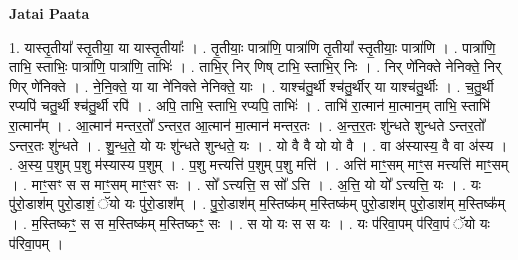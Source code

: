 \documentclass[17pt]{extarticle}
\begin{document}
\textbf{Jatai Paata} \newline

1. यास्तृ॒तीया᳚ स्तृ॒तीया॒ या यास्तृ॒तीयाः᳚ । . तृ॒तीयाः॒ पात्रा॑णि॒ पात्रा॑णि तृ॒तीया᳚ स्तृ॒तीयाः॒ पात्रा॑णि । . पात्रा॑णि॒ ताभि॒ स्ताभिः॒ पात्रा॑णि॒ पात्रा॑णि॒ ताभिः॑ । . ताभि॒र् निर् णिष् टाभि॒ स्ताभि॒र् निः । . निर् णे॑निक्ते नेनिक्ते॒ निर् णिर् णे॑निक्ते । . ने॒नि॒क्ते॒ या या ने॑निक्ते नेनिक्ते॒ याः । . याश्च॑तु॒र्थी श्च॑तु॒र्थीर् या याश्च॑तु॒र्थीः । . च॒तु॒र्थी रप्यपि॑ चतु॒र्थी श्च॑तु॒र्थी रपि॑ । . अपि॒ ताभि॒ स्ताभि॒ रप्यपि॒ ताभिः॑ । . ताभि॑ रा॒त्मान॑ मा॒त्मान॒म् ताभि॒ स्ताभि॑ रा॒त्मान᳚म् । . आ॒त्मान॑ मन्तर॒तो᳚ ऽन्तर॒त आ॒त्मान॑ मा॒त्मान॑ मन्तर॒तः । . अ॒न्त॒र॒तः शु॑न्धते शुन्धते ऽन्तर॒तो᳚ ऽन्तर॒तः शु॑न्धते । . शु॒न्ध॒ते॒ यो यः शु॑न्धते शुन्धते॒ यः । . यो वै वै यो यो वै । . वा अ॑स्यास्य॒ वै वा अ॑स्य । . अ॒स्य॒ प॒शुम् प॒शु म॑स्यास्य प॒शुम् । . प॒शु मत्त्यत्ति॑ प॒शुम् प॒शु मत्ति॑ । . अत्ति॑ माꣳ॒॒सम् माꣳ॒॒स मत्त्यत्ति॑ माꣳ॒॒सम् । . माꣳ॒॒सꣳ स स माꣳ॒॒सम् माꣳ॒॒सꣳ सः । . सो᳚ ऽत्त्यत्ति॒ स सो᳚ ऽत्ति । . अ॒त्ति॒ यो यो᳚ ऽत्त्यत्ति॒ यः । . यः पु॑रो॒डाश॑म् पुरो॒डाशं॒ ॅयो यः पु॑रो॒डाश᳚म् । . पु॒रो॒डाश॑म् म॒स्तिष्क॑म् म॒स्तिष्क॑म् पुरो॒डाश॑म् पुरो॒डाश॑म् म॒स्तिष्क᳚म् । . म॒स्तिष्कꣳ॒॒ स स म॒स्तिष्क॑म् म॒स्तिष्कꣳ॒॒ सः । . स यो यः स स यः । . यः प॑रिवा॒पम् प॑रिवा॒पं ॅयो यः प॑रिवा॒पम् । \newline
\end{document}

